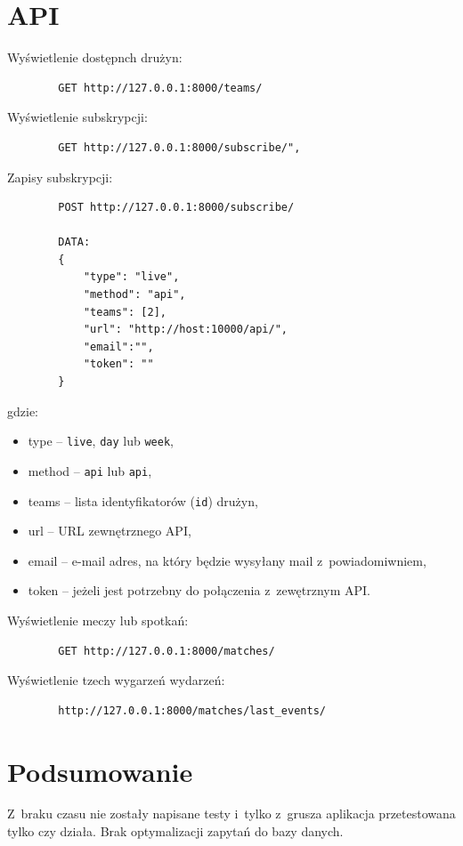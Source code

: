 \documentclass[11pt,a4paper]{article}
\begin{document}
    \newpage

    \section{API}

    Wyświetlenie dostępnch drużyn: \\

    \begin{verbatim}
        GET http://127.0.0.1:8000/teams/
    \end{verbatim}

    Wyświetlenie subskrypcji: \\

    \begin{verbatim}
        GET http://127.0.0.1:8000/subscribe/",
    \end{verbatim}

    Zapisy subskrypcji: \\

    \begin{verbatim}
        POST http://127.0.0.1:8000/subscribe/

        DATA:
        {
            "type": "live",
            "method": "api",
            "teams": [2],
            "url": "http://host:10000/api/",
            "email":"",
            "token": ""
        }
    \end{verbatim}

    gdzie:

    \begin{itemize}
        \item type -- \verb+live+, \verb+day+ lub \verb+week+,
        \item method -- \verb+api+ lub \verb+api+,
        \item teams -- lista identyfikatorów (\verb+id+) drużyn,
        \item url -- URL zewnętrznego API,
        \item email -- e-mail adres, na który będzie wysyłany mail z~powiadomiwniem,
        \item token --  jeżeli jest potrzebny do połączenia z~zewętrznym API.
    \end{itemize}

    Wyświetlenie meczy lub spotkań: \\

    \begin{verbatim}
        GET http://127.0.0.1:8000/matches/
    \end{verbatim}

    Wyświetlenie tzech wygarzeń wydarzeń: \\

    \begin{verbatim}
        http://127.0.0.1:8000/matches/last_events/
    \end{verbatim}

    \section{Podsumowanie}

    Z~braku czasu nie zostały napisane testy i~tylko z~grusza aplikacja przetestowana tylko czy działa.
    Brak optymalizacji zapytań do bazy danych.\\
\end{document}
